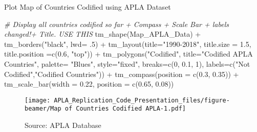 \documentclass[
  ignorenonframetext,
]{beamer}
\newenvironment{Shaded}{\begin{snugshade}}{\end{snugshade}}
\newcommand{\AttributeTok}[1]{\textcolor[rgb]{0.77,0.63,0.00}{#1}}
\newcommand{\CommentTok}[1]{\textcolor[rgb]{0.56,0.35,0.01}{\textit{#1}}}
\newcommand{\DecValTok}[1]{\textcolor[rgb]{0.00,0.00,0.81}{#1}}
\newcommand{\FloatTok}[1]{\textcolor[rgb]{0.00,0.00,0.81}{#1}}
\newcommand{\FunctionTok}[1]{\textcolor[rgb]{0.00,0.00,0.00}{#1}}
\newcommand{\NormalTok}[1]{#1}
\newcommand{\SpecialCharTok}[1]{\textcolor[rgb]{0.00,0.00,0.00}{#1}}
\newcommand{\StringTok}[1]{\textcolor[rgb]{0.31,0.60,0.02}{#1}}
\begin{document}
\begin{frame}[fragile]{Plot Map of Countries Codified using APLA
Dataset}
\begin{Shaded}
\begin{Highlighting}[]
\CommentTok{\# Display all countries codified so far + Compass + Scale Bar + labels changed!+ Title. USE THIS}
\FunctionTok{tm\_shape}\NormalTok{(Map\_APLA\_Data) }\SpecialCharTok{+} \FunctionTok{tm\_borders}\NormalTok{(}\StringTok{"black"}\NormalTok{, }\AttributeTok{lwd=}\NormalTok{ .}\DecValTok{5}\NormalTok{) }\SpecialCharTok{+} 
  \FunctionTok{tm\_layout}\NormalTok{(}\AttributeTok{title=}\StringTok{"1990{-}2018"}\NormalTok{, }\AttributeTok{title.size =} \FloatTok{1.5}\NormalTok{, }\AttributeTok{title.position =}\FunctionTok{c}\NormalTok{(}\FloatTok{0.6}\NormalTok{, }\StringTok{"top"}\NormalTok{)) }\SpecialCharTok{+} 
  \FunctionTok{tm\_polygons}\NormalTok{(}\StringTok{"Codified"}\NormalTok{, }\AttributeTok{title=}\StringTok{"Codified APLA Countries"}\NormalTok{, }\AttributeTok{palette=} \StringTok{"Blues"}\NormalTok{, }\AttributeTok{style=}\StringTok{"fixed"}\NormalTok{, }\AttributeTok{breaks=}\FunctionTok{c}\NormalTok{(}\DecValTok{0}\NormalTok{, }\FloatTok{0.1}\NormalTok{, }\DecValTok{1}\NormalTok{), }
              \AttributeTok{labels=}\FunctionTok{c}\NormalTok{(}\StringTok{"Not Codified"}\NormalTok{,}\StringTok{"Codified Countries"}\NormalTok{)) }\SpecialCharTok{+} \FunctionTok{tm\_compass}\NormalTok{(}\AttributeTok{position =} \FunctionTok{c}\NormalTok{(}\FloatTok{0.3}\NormalTok{, }\FloatTok{0.35}\NormalTok{)) }\SpecialCharTok{+} 
  \FunctionTok{tm\_scale\_bar}\NormalTok{(}\AttributeTok{width =} \FloatTok{0.22}\NormalTok{, }\AttributeTok{position =} \FunctionTok{c}\NormalTok{(}\FloatTok{0.65}\NormalTok{, }\FloatTok{0.08}\NormalTok{)) }
\end{Highlighting}
\end{Shaded}

\begin{figure}
\centering
\texttt{[image: APLA\_Replication\_Code\_Presentation\_files/figure-beamer/Map of Countries Codified APLA-1.pdf]}
\caption{Source: APLA Database}
\end{figure}
\end{frame}
\end{document}
